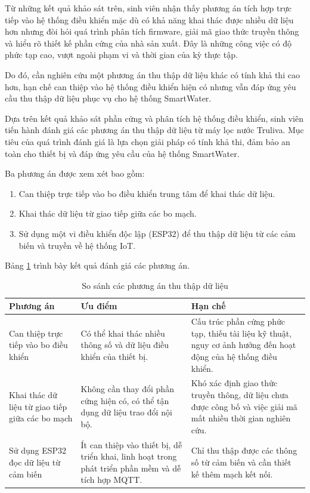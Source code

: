 Từ những kết quả khảo sát trên, sinh viên nhận thấy phương án tích hợp trực tiếp vào hệ thống điều khiển mặc dù có khả năng khai thác được nhiều dữ liệu hơn nhưng đòi hỏi quá trình phân tích firmware, giải mã giao thức truyền thông và hiểu rõ thiết kế phần cứng của nhà sản xuất. Đây là những công việc có độ phức tạp cao, vượt ngoài phạm vi và thời gian của kỳ thực tập.

Do đó, cần nghiên cứu một phương án thu thập dữ liệu khác có tính khả thi cao hơn, hạn chế can thiệp vào hệ thống điều khiển hiện có nhưng vẫn đáp ứng yêu cầu thu thập dữ liệu phục vụ cho hệ thống SmartWater.

Dựa trên kết quả khảo sát phần cứng và phân tích hệ thống điều khiển, sinh viên tiến hành đánh giá các phương án thu thập dữ liệu từ máy lọc nước Truliva. Mục tiêu của quá trình đánh giá là lựa chọn giải pháp có tính khả thi, đảm bảo an toàn cho thiết bị và đáp ứng yêu cầu của hệ thống SmartWater.

Ba phương án được xem xét bao gồm:

\begin{enumerate}
    \item Can thiệp trực tiếp vào bo điều khiển trung tâm để khai thác dữ liệu.
    \item Khai thác dữ liệu từ giao tiếp giữa các bo mạch.
    \item Sử dụng một vi điều khiển độc lập (ESP32) để thu thập dữ liệu từ các cảm biến và truyền về hệ thống IoT.
\end{enumerate}

Bảng \ref{tab:solution_compare} trình bày kết quả đánh giá các phương án.

\begin{table}[H]
\centering
\caption{So sánh các phương án thu thập dữ liệu}
\label{tab:solution_compare}
\begin{tabular}{|p{4cm}|p{5cm}|p{5cm}|}
\hline
\textbf{Phương án} & \textbf{Ưu điểm} & \textbf{Hạn chế} \\
\hline

Can thiệp trực tiếp vào bo điều khiển &
Có thể khai thác nhiều thông số và dữ liệu điều khiển của thiết bị. &
Cấu trúc phần cứng phức tạp, thiếu tài liệu kỹ thuật, nguy cơ ảnh hưởng đến hoạt động của hệ thống điều khiển. \\
\hline

Khai thác dữ liệu từ giao tiếp giữa các bo mạch &
Không cần thay đổi phần cứng hiện có, có thể tận dụng dữ liệu trao đổi nội bộ. &
Khó xác định giao thức truyền thông, dữ liệu chưa được công bố và việc giải mã mất nhiều thời gian nghiên cứu. \\
\hline

Sử dụng ESP32 đọc dữ liệu từ cảm biến &
Ít can thiệp vào thiết bị, dễ triển khai, linh hoạt trong phát triển phần mềm và dễ tích hợp MQTT. &
Chỉ thu thập được các thông số từ cảm biến và cần thiết kế thêm mạch kết nối. \\
\hline

\end{tabular}
\end{table}

